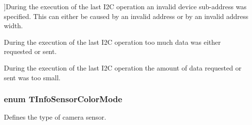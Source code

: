 \begin{Desc}
\begin{description}
{}]During the execution of the last I2\+C operation an invalid device sub-\/address was specified. This can either be caused by an invalid address or by an invalid address width. \item[{\em 
\hypertarget{group___device_specific_interface_gga141afcf1d25294043818cb39a26914afa41bf4874161dbb926cf48d93ac8530cd}{I2\+Cos\+Too\+Much\+Data}\label{group___device_specific_interface_gga141afcf1d25294043818cb39a26914afa41bf4874161dbb926cf48d93ac8530cd}
}]During the execution of the last I2\+C operation too much data was either requested or sent. \item[{\em 
\hypertarget{group___device_specific_interface_gga141afcf1d25294043818cb39a26914afa30c940dbd06e8c1e5da72826bc46873c}{I2\+Cos\+Not\+Enough\+Data}\label{group___device_specific_interface_gga141afcf1d25294043818cb39a26914afa30c940dbd06e8c1e5da72826bc46873c}
}]During the execution of the last I2\+C operation the amount of data requested or sent was too small. \end{description}
\end{Desc}
\hypertarget{group___device_specific_interface_ga45dccb9c972f4e6cb713da77a694c1e6}{
\subsubsection[{T\+Info\+Sensor\+Color\+Mode}]{\setlength{\rightskip}{0pt plus 5cm}enum {\bf T\+Info\+Sensor\+Color\+Mode}}}\label{group___device_specific_interface_ga45dccb9c972f4e6cb713da77a694c1e6}


Defines the type of camera sensor. 

